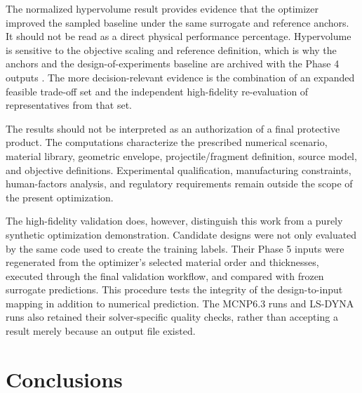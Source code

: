 \documentclass[12pt]{elsarticle}
\begin{document}
	The normalized hypervolume result provides evidence that the optimizer improved the sampled baseline under the same surrogate and reference anchors. It should not be read as a direct physical performance percentage. Hypervolume is sensitive to the objective scaling and reference definition, which is why the anchors and the design-of-experiments baseline are archived with the Phase 4 outputs \cite{EmmerichDeutz2018,ZitzlerThiele1999}. The more decision-relevant evidence is the combination of an expanded feasible trade-off set and the independent high-fidelity re-evaluation of representatives from that set.
	
	The results should not be interpreted as an authorization of a final protective product. The computations characterize the prescribed numerical scenario, material library, geometric envelope, projectile/fragment definition, source model, and objective definitions. Experimental qualification, manufacturing constraints, human-factors analysis, and regulatory requirements remain outside the scope of the present optimization.
	
	The high-fidelity validation does, however, distinguish this work from a purely synthetic optimization demonstration. Candidate designs were not only evaluated by the same code used to create the training labels. Their Phase 5 inputs were regenerated from the optimizer's selected material order and thicknesses, executed through the final validation workflow, and compared with frozen surrogate predictions. This procedure tests the integrity of the design-to-input mapping in addition to numerical prediction. The MCNP6.3 runs and LS-DYNA runs also retained their solver-specific quality checks, rather than accepting a result merely because an output file existed.
	
	\section{Conclusions}
	
\end{document}
